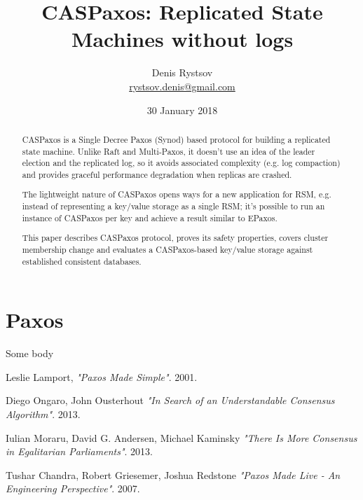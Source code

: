 \documentclass[12pt]{article}
\begin{document}
\title{CASPaxos: Replicated State Machines without logs}
\date{30 January 2018}
\author{Denis Rystsov \\
\href{mailto:rystsov.denis@gmail.com}{rystsov.denis@gmail.com}}


\maketitle

\begin{abstract}
CASPaxos is a Single Decree Paxos (Synod) based protocol for building a replicated state machine. Unlike Raft and Multi-Paxos, it doesn't use an idea of the leader election and the replicated log, so it avoids associated complexity (e.g. log compaction) and provides graceful performance degradation when replicas are crashed.

The lightweight nature of CASPaxos opens ways for a new application for RSM, e.g. instead of representing a key/value storage as a single RSM; it's possible to run an instance of CASPaxos per key and achieve a result similar to EPaxos.

This paper describes CASPaxos protocol, proves its safety properties, covers cluster membership change and evaluates a CASPaxos-based key/value storage against established consistent databases.
\end{abstract}


\section{Paxos}

Some body

\newpage

\begin{thebibliography}{9}

  Leslie Lamport,
  \emph{"Paxos Made Simple"}.
  2001.

  Diego Ongaro, John Ousterhout
  \emph{"In Search of an Understandable Consensus Algorithm"}.
  2013.

  Iulian Moraru, David G. Andersen, Michael Kaminsky
  \emph{"There Is More Consensus in Egalitarian Parliaments"}.
  2013.

  Tushar Chandra, Robert Griesemer, Joshua Redstone
  \emph{"Paxos Made Live - An Engineering Perspective"}.
  2007.


\end{thebibliography}
\end{document}
